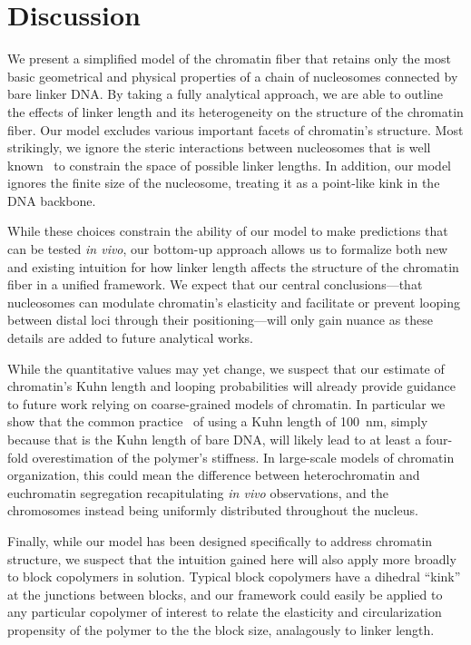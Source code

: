 \documentclass[%
 reprint,
superscriptaddress,
showpacs,preprintnumbers,
 amsmath,amssymb,
 aps,
 prl,
]{revtex4-1}
\begin{document}
\section{Discussion}

We present a simplified model of the chromatin fiber that retains only the most
    basic geometrical and physical properties of a chain of nucleosomes
    connected by bare linker DNA.\@
By taking a fully analytical approach, we are able to outline the effects of
    linker length and its heterogeneity on the structure of the chromatin fiber.
Our model excludes various important facets of chromatin's structure.
Most strikingly, we ignore the steric interactions between nucleosomes that is
    well known~\cite{widom1992} to constrain the space of possible linker
    lengths.
In addition, our model ignores the finite size of the nucleosome, treating it as
    a point-like kink in the DNA backbone.

While these choices constrain the ability of our model to make predictions that
    can be tested \textit{in vivo}, our bottom-up approach allows us to
    formalize both new and existing intuition for how linker length affects the
    structure of the chromatin fiber in a unified framework.
We expect that our central conclusions---that nucleosomes can modulate
    chromatin's elasticity and facilitate or prevent looping between distal loci
    through their positioning---will only gain nuance as these details are added
    to future analytical works.

While the quantitative values may yet change, we suspect that our estimate of
    chromatin's Kuhn length and looping probabilities will already provide
    guidance to future work relying on coarse-grained models of chromatin.
In particular we show that the common practice~\cite{macpherson2018,nuebler2018}
    of using a Kuhn length of \SI{100}{\nano\metre}, simply because that is the
    Kuhn length of bare DNA, will likely lead to at least a four-fold
    overestimation of the polymer's stiffness.
In large-scale models of chromatin organization, this could mean the difference
    between heterochromatin and euchromatin segregation recapitulating
    \textit{in vivo} observations, and the chromosomes instead being uniformly
    distributed throughout the nucleus.

Finally, while our model has been designed specifically to address chromatin
    structure, we suspect that the intuition gained here will also apply more
    broadly to block copolymers in solution.
Typical block copolymers have a dihedral ``kink'' at the junctions between
    blocks, and our framework could easily be applied to any particular
    copolymer of interest to relate the elasticity and circularization
    propensity of the polymer to the the block size, analagously to linker
    length.
\end{document}

